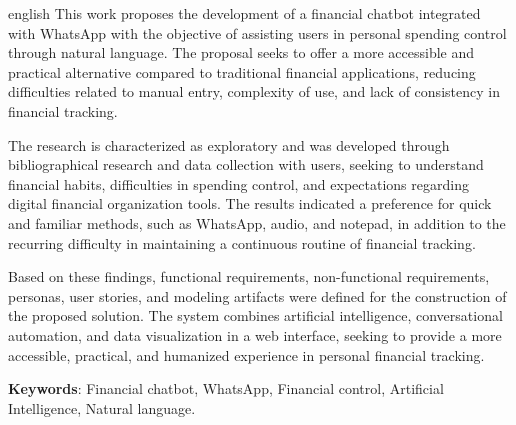 \begin{resumo}[Abstract]
\begin{otherlanguage*}{english}
This work proposes the development of a financial chatbot integrated with WhatsApp with the objective of assisting users in personal spending control through natural language. The proposal seeks to offer a more accessible and practical alternative compared to traditional financial applications, reducing difficulties related to manual entry, complexity of use, and lack of consistency in financial tracking.
    
The research is characterized as exploratory and was developed through bibliographical research and data collection with users, seeking to understand financial habits, difficulties in spending control, and expectations regarding digital financial organization tools. The results indicated a preference for quick and familiar methods, such as WhatsApp, audio, and notepad, in addition to the recurring difficulty in maintaining a continuous routine of financial tracking.

Based on these findings, functional requirements, non-functional requirements, personas, user stories, and modeling artifacts were defined for the construction of the proposed solution. The system combines artificial intelligence, conversational automation, and data visualization in a web interface, seeking to provide a more accessible, practical, and humanized experience in personal financial tracking.

\textbf{Keywords}: Financial chatbot, WhatsApp, Financial control, Artificial Intelligence, Natural language.
\end{otherlanguage*}
\end{resumo}
